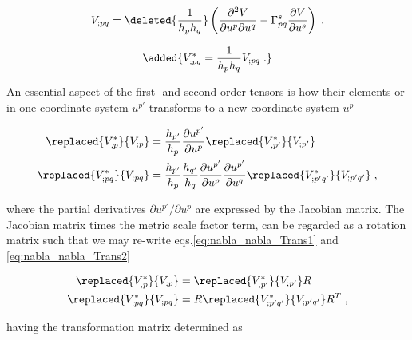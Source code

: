 \documentclass[extra,mreferee]{gji}
\begin{document}
\begin{equation}
V_{;pq} = \deleted{\frac{1}{h_p h_q}} \left( \frac{\partial^2 V}{\partial u^p \partial u^q} - \Gamma_{pq}^s \frac{\partial V}{\partial u^s}  \right)  \; . \label{eq:nabla_nabla_V}
\end{equation}


\begin{equation}
\added{V_{;pq}^* = \frac{1}{h_p h_q} V_{;pq} \; .} \label{eq:nabla_nabla_V_phys}
\end{equation}

 An essential aspect of the first- and second-order tensors is how their  elements  or  in one coordinate system $u^{p'}$ transforms to a new coordinate system $u^p$ \citep[p.~811]{Casotto_Fantino_2009,Riley_etal_2004}

\begin{align}
\replaced{V_{,p}^*}{V_{;p}}  &= \frac{h_{p'}}{h_p} \frac{\partial u^{p'}}{\partial u^p}\replaced{V_{,p'}^*}{V_{;p'}}  \label{eq:nabla_nabla_Trans1} \\
\replaced{V^*_{;pq}}{V_{;pq}}  &= \frac{h_{p'}}{h_p} \frac{h_{q'}}{h_q} \frac{\partial u^{p'}}{\partial u^p} \frac{\partial u^{p'}}{\partial u^q} \replaced{V^*_{;p'q'}}{V_{;p'q'}}  \; , \label{eq:nabla_nabla_Trans2}
\end{align}

where the partial derivatives $\partial u^{p'}/\partial u^p$ are expressed by the Jacobian matrix. The Jacobian matrix times the metric scale factor term, can be regarded as a rotation matrix such that we may re-write eqs.\eqref{eq:nabla_nabla_Trans1} and \eqref{eq:nabla_nabla_Trans2} 

\begin{align}
\replaced{V^*_{,p}}{V_{;p}}  &= \replaced{V^*_{,p'}}{V_{;p'}} R       \label{eq:nabla_nabla_Trans1_2} \\
\replaced{V^*_{;pq}}{V_{;pq}} &= R \replaced{V^*_{;p'q'}}{V_{;p'q'}} R^T  \label{eq:nabla_nabla_Trans2_2} \;,
\end{align}

having the transformation matrix determined as
\end{document}
